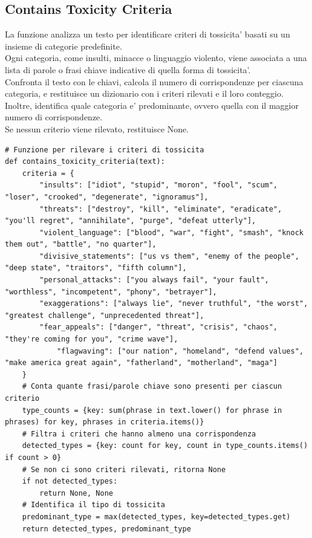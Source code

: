 \documentclass{article}
\begin{document}
		\subsection{Contains Toxicity Criteria}

La funzione analizza un testo per identificare criteri di tossicita' basati su un insieme di categorie predefinite. \\Ogni categoria, come insulti, minacce o linguaggio violento, viene associata a una lista di parole o frasi chiave indicative di quella forma di tossicita'.\\
Confronta il testo con le chiavi, calcola il numero di corrispondenze per ciascuna categoria, e restituisce un dizionario con i criteri rilevati e il loro conteggio. \\Inoltre, identifica quale categoria e' predominante, ovvero quella con il maggior numero di corrispondenze. \\Se nessun criterio viene rilevato, restituisce None.
	\begin{lstlisting}
# Funzione per rilevare i criteri di tossicita
def contains_toxicity_criteria(text):
	criteria = {
		"insults": ["idiot", "stupid", "moron", "fool", "scum", "loser", "crooked", "degenerate", "ignoramus"],
		"threats": ["destroy", "kill", "eliminate", "eradicate", "you'll regret", "annihilate", "purge", "defeat utterly"],
		"violent_language": ["blood", "war", "fight", "smash", "knock them out", "battle", "no quarter"],
		"divisive_statements": ["us vs them", "enemy of the people", "deep state", "traitors", "fifth column"],
		"personal_attacks": ["you always fail", "your fault", "worthless", "incompetent", "phony", "betrayer"],
		"exaggerations": ["always lie", "never truthful", "the worst", "greatest challenge", "unprecedented threat"],
		"fear_appeals": ["danger", "threat", "crisis", "chaos", "they're coming for you", "crime wave"],
			"flagwaving": ["our nation", "homeland", "defend values", "make america great again", "fatherland", "motherland", "maga"]
	}
	# Conta quante frasi/parole chiave sono presenti per ciascun criterio
	type_counts = {key: sum(phrase in text.lower() for phrase in phrases) for key, phrases in criteria.items()}
	# Filtra i criteri che hanno almeno una corrispondenza
	detected_types = {key: count for key, count in type_counts.items() if count > 0}
	# Se non ci sono criteri rilevati, ritorna None
	if not detected_types:
		return None, None
	# Identifica il tipo di tossicita
	predominant_type = max(detected_types, key=detected_types.get)
	return detected_types, predominant_type
	\end{lstlisting}
	
\end{document}
